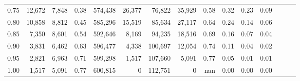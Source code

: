 \begin{tabular}{rrrrrrrrrrrrrrr}
0.75 &  12,672 &   7,848 &  0.38 &  574,438 &   26,377 &   76,822 &   35,929 &  0.58 &  0.32 &  0.23 &      0.09 \\
0.80 &  10,858 &   8,812 &  0.45 &  585,296 &   15,519 &   85,634 &   27,117 &  0.64 &  0.24 &  0.14 &      0.06 \\
0.85 &   7,350 &   8,601 &  0.54 &  592,646 &    8,169 &   94,235 &   18,516 &  0.69 &  0.16 &  0.07 &      0.04 \\
0.90 &   3,831 &   6,462 &  0.63 &  596,477 &    4,338 &  100,697 &   12,054 &  0.74 &  0.11 &  0.04 &      0.02 \\
0.95 &   2,821 &   6,963 &  0.71 &  599,298 &    1,517 &  107,660 &    5,091 &  0.77 &  0.05 &  0.01 &      0.01 \\
1.00 &   1,517 &   5,091 &  0.77 &  600,815 &        0 &  112,751 &        0 &   nan &  0.00 &  0.00 &      0.00 \\
\bottomrule
\end{tabular}
